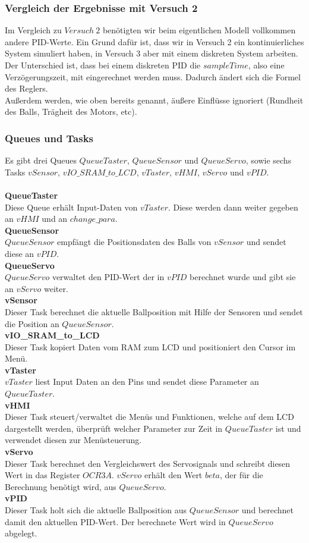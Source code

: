 \subsubsection{Vergleich der Ergebnisse mit Versuch 2}
Im Vergleich zu $Versuch\ 2$ benötigten wir beim eigentlichen Modell vollkommen andere PID-Werte. Ein Grund dafür ist, dass wir in Versuch 2 ein kontinuierliches System simuliert haben, in Versuch 3 aber mit einem diskreten System arbeiten. Der Unterschied ist, dass bei einem diskreten PID die $sampleTime$, also eine Verzögerungszeit, mit eingerechnet werden muss. Dadurch ändert sich die Formel des Reglers.\\
Außerdem werden, wie oben bereits genannt, äußere Einflüsse ignoriert (Rundheit des Balls, Trägheit des Motors, etc).

\subsubsection{Queues und Tasks}
Es gibt drei Queues $QueueTaster$, $QueueSensor$ und $QueueServo$, sowie sechs Tasks $vSensor$, $vIO\_SRAM\_to\_LCD$, $vTaster$, $vHMI$, $vServo$ und $vPID$.\\
\\
{\bfseries QueueTaster}\\
Diese Queue erhält Input-Daten von $vTaster$. Diese werden dann weiter gegeben an $vHMI$ und an $change\_para$.\\
{\bfseries QueueSensor} \\
$QueueSensor$ empfängt die Positionsdaten des Balls von $vSensor$ und sendet diese an $vPID$.\\
{\bfseries QueueServo} \\
$QueueServo$ verwaltet den PID-Wert der in $vPID$ berechnet wurde und gibt sie an $vServo$ weiter.\\
{\bfseries vSensor} \\
Dieser Task berechnet die aktuelle Ballposition mit Hilfe der Sensoren und sendet die Position an $QueueSensor$.\\
{\bfseries vIO\_SRAM\_to\_LCD} \\
Dieser Task kopiert Daten vom RAM zum LCD und positioniert den Cursor im Menü.\\
{\bfseries vTaster} \\
$vTaster$ liest Input Daten an den Pins und sendet diese Parameter an $QueueTaster$.\\
{\bfseries vHMI} \\
Dieser Task steuert/verwaltet die Menüs und Funktionen, welche auf dem LCD dargestellt werden, überprüft welcher Parameter zur Zeit in $QueueTaster$ ist und verwendet diesen zur Menüsteuerung.\\
{\bfseries vServo} \\
Dieser Task berechnet den Vergleichswert des Servosignals und schreibt diesen Wert in das Register $OCR3A$. $vServo$ erhält den Wert $beta$, der für die Berechnung benötigt wird, aus $QueueServo$.\\
{\bfseries vPID} \\
Dieser Task holt sich die aktuelle Ballposition aus $QueueSensor$ und berechnet damit den aktuellen PID-Wert. Der berechnete Wert wird in $QueueServo$ abgelegt.\\


